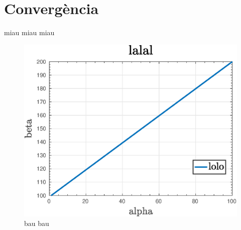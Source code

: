 \chapter{Convergència}
miau miau miau
\begin{figure}[h]
		\includegraphics[width=\textwidth]{./plots/test}
		\caption{bau bau}
\end{figure}
